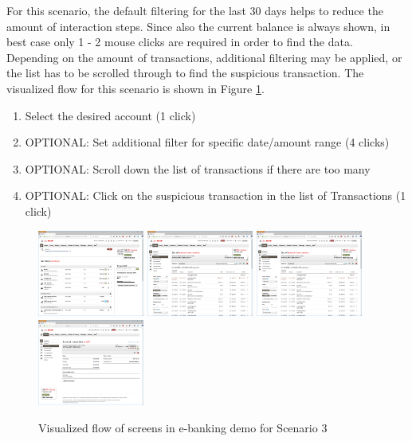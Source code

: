 For this scenario, the default filtering for the last 30 days helps to reduce the amount of interaction steps. Since also the current balance is always shown, in best case only 1 - 2 mouse clicks are required in order to find the data. Depending on the amount of transactions, additional filtering may be applied, or the list has to be scrolled through to find the suspicious transaction. The visualized flow for this scenario is shown in Figure \ref{fig:scenariothreeebanking}.
\begin{enumerate}
	\item Select the desired account (1 click)
	\item OPTIONAL: Set additional filter for specific date/amount range (4 clicks)
	\item OPTIONAL: Scroll down the list of transactions if there are too many
	\item OPTIONAL: Click on the suspicious transaction in the list of Transactions (1 click)
\end{enumerate}
\begin{figure}[h]
	\begin{center}
		\includegraphics[width=3.5cm]{03_Figures/09_Evaluation/UBS_1_Overview.png}
		\includegraphics[width=3.5cm]{03_Figures/09_Evaluation/UBS_3_AccountTransactions.png}
		\includegraphics[width=3.5cm]{03_Figures/09_Evaluation/UBS_3_AccountTransactions.png}
		\includegraphics[width=3.5cm]{03_Figures/09_Evaluation/UBS_4_AccountTransactionDetails.png}
		\caption{Visualized flow of screens in e-banking demo for Scenario 3}
		\label{fig:scenariothreeebanking}
	\end{center}
\end{figure}

